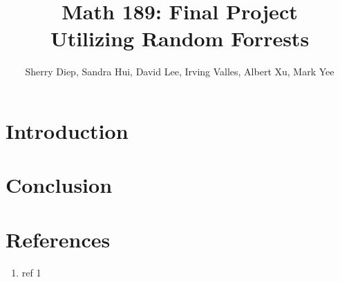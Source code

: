 \documentclass[11pt]{article} %
\title{\textbf{Math 189: Final Project}\\Utilizing Random Forrests} %
\author{Sherry Diep, Sandra Hui, David Lee, Irving Valles, Albert Xu, Mark Yee}
\begin{document}
\maketitle

\section*{Introduction}

\section*{Conclusion}

\section*{References}
\begin{enumerate}[1.]
\item ref 1
\end{enumerate}
\end{document}
